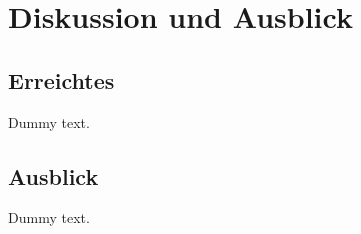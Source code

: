 \chapter{Diskussion und Ausblick}

\section{Erreichtes}

Dummy text.

\section{Ausblick}

Dummy text.
